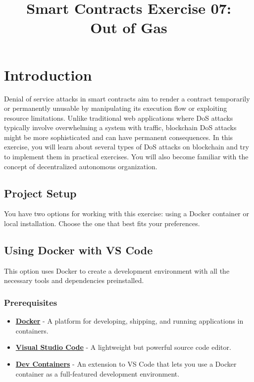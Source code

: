 \documentclass[12pt]{article}
\title{Smart Contracts Exercise 07: \\ Out of Gas}
\author{}
\date{}
\begin{document}
\maketitle
\section{Introduction}

Denial of service attacks in smart contracts aim to render a contract
temporarily or permanently unusable by manipulating its execution flow or
exploiting resource limitations. Unlike traditional web applications where DoS
attacks typically involve overwhelming a system with traffic, blockchain DoS
attacks might be more sophisticated and can have permanent consequences. In
this exercise, you will learn about several types of DoS attacks on blockchain
and try to implement them in practical exercises. You will also become familiar
with the concept of decentralized autonomous organization.

\subsection*{Project Setup}

You have two options for working with this exercise: using a Docker container or
local installation. Choose the one that best fits your preferences.

\subsection{Using Docker with VS Code}

This option uses Docker to create a development environment with all the
necessary tools and dependencies preinstalled.

\subsubsection*{Prerequisites}

\begin{itemize}
    \item \textbf{\href{https://www.docker.com/products/docker-desktop}{Docker}} - A platform for developing, shipping, and running applications in containers.
    \item \textbf{\href{https://code.visualstudio.com/}{Visual Studio Code}} - A lightweight but powerful source code editor.
    \item \textbf{\href{https://marketplace.visualstudio.com/items?itemName=ms-vscode-remote.remote-containers}{Dev Containers}} - An extension to VS Code that lets you use a Docker container as a full-featured development environment.
\end{itemize}
\end{document}
